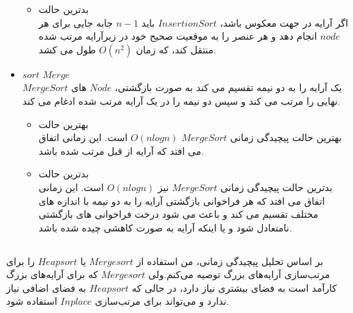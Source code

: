 \documentclass[12pt]{article}
\begin{document}
\begin{itemize}
\begin{itemize}
                \item بدترین حالت
                \\
                اگر آرایه در جهت معکوس باشد، $Insertion Sort$ باید $n-1$ جابه جایی برای هر $node$ انجام دهد و هر عنصر را به موقعیت صحیح خود در زیرآرایه مرتب شده منتقل کند، که زمان $O(n^2)$ طول می کشد.
            \end{itemize}
    \item $sort$ $Merge$
    \\
    $Merge Sort$ یک آرایه را به دو نیمه تقسیم می کند به صورت بازگشتی، $Node$ های نهایی را مرتب می کند و سپس دو نیمه را در یک آرایه مرتب شده ادغام می کند.
                \begin{itemize}
                \item بهترین حالت
                \\
                 بهترین حالت پیچیدگی زمانی $Merge Sort$ $O(n log n)$ است. این زمانی اتفاق می افتد که آرایه از قبل مرتب شده باشد.
            
                \item بدترین حالت
                \\
                بدترین حالت پیچیدگی زمانی $Merge Sort$ نیز $O(n log n)$ است. این زمانی اتفاق می افتد که هر فراخوانی بازگشتی آرایه را به دو نیمه با اندازه های مختلف تقسیم می کند و باعث می شود درخت فراخوانی های بازگشتی نامتعادل شود و یا اینکه آرایه به صورت کاهشی چیده شده باشد.
            \end{itemize}
\end{itemize}
\subsection{}
بر اساس تحلیل پیچیدگی زمانی، من استفاده از $Merge sort$ یا $Heap sort$ را برای مرتب‌سازی آرایه‌های بزرگ توصیه می‌کنم.ولی $Merge sort$ که برای آرایه‌های بزرگ کارآمد است به فضای بیشتری نیاز دارد، در حالی که $Heap sort$ به فضای اضافی نیاز ندارد و می‌تواند برای مرتب‌سازی $In place$ استفاده شود.
\end{document}
